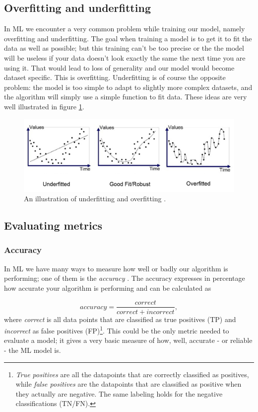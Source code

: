 \subsection{Overfitting and underfitting}
In ML we encounter a very common problem while training our model, namely overfitting and underfitting. The goal when training a model is to get it to fit the data as well as possible; but this training can't be too precise or the the model will be useless if your data doesn't look exactly the same the next time you are using it. That would lead to loss of generality and our model would become dataset specific. This is overfitting. Underfitting is of course the opposite problem: the model is too simple to adapt to slightly more complex datasets, and the algorithm will simply use a simple function to fit data. These ideas are very well illustrated in figure \ref{fig:overunderfitting}. 

\begin{figure}[H]
    \centering
    \includegraphics[width = \textwidth]{Figures/FromOnline/overunderfitting.png}
    \caption{An illustration of underfitting and overfitting \cite{overunderfittingpic}.}
    \label{fig:overunderfitting}
\end{figure}



\subsection{Evaluating metrics}

\subsubsection{Accuracy}
In ML we have many ways to measure how well or badly our algorithm is performing; one of them is the \textit{accuracy} \cite{accuracy}. The accuracy expresses in percentage how accurate your algorithm is performing and can be calculated as

\begin{equation}
    \label{eq:acc}
    accuracy = \frac{correct}{correct + incorrect},
\end{equation}
where \textit{correct} is all data points that are classified as true positives (TP) and \textit{incorrect} as false positives (FP)\footnote{\textit{True positives} are all the datapoints that are correctly classified as positives, while \textit{false positives} are the datapoints that are classified as positive when they actually are negative. The same labeling holds for the negative classifications (TN/FN).}. This could be the only metric needed to evaluate a model; it gives a very basic measure of how, well, accurate - or reliable - the ML model is. 

